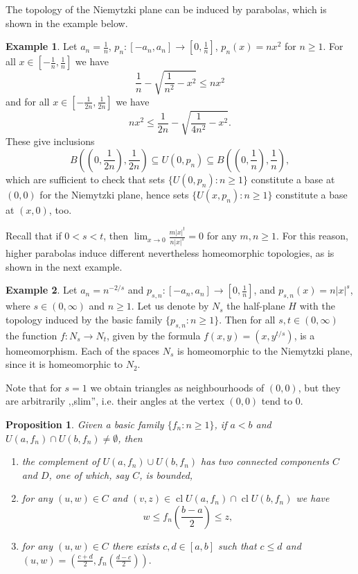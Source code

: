 \documentclass[a4paper,12pt,leqno]{amsart}
\newcommand{\cl}{\operatorname{cl}}
\newtheorem{pro}[thm]{Proposition}
\theoremstyle{definition}
\newtheorem{exm}{Example}
\renewcommand{\geq}{\geqslant}
\renewcommand{\leq}{\leqslant}
\begin{document}
The topology of the Niemytzki plane can be induced by parabolas, which is shown in the  example below.
\begin{exm}\label{exm:1}
  Let $a_n=\frac1{n}$, $p_{n}\colon [-a_n,a_n]\to[0,\frac1n]$, $p_{n}(x)=nx^2$ for  $n\geq 1$.
For all $x\in[-\frac1n,\frac1n]$ we have
  $$\textstyle\frac1n-\sqrt{\frac1{n^2}-x^2}\leq nx^2$$
  and for all $x\in[-\frac1{2n},\frac1{2n}]$ we have
  $$\textstyle nx^2\leq\frac1{2n}-\sqrt{\frac1{4n^2}-x^2}.$$
These give inclusions
$$\textstyle B((0,\frac1{2n}),\frac1{2n})\subseteq U(0,p_n)\subseteq B((0,\frac1n),\frac1n),$$
which are sufficient to check that sets $\{U(0,p_n)\colon n\geq 1\}$ constitute a base at $(0,0)$ for the Niemytzki plane, hence sets $\{U(x,p_n)\colon n\geq 1\}$ constitute a base at $(x,0)$, too.
\end{exm}

Recall that if $0<s<t$, then $\lim_{x\to0}\frac{m|x|^t}{n|x|^s}=0$ for any $m,n\geq 1$.
For this reason,  higher parabolas induce different nevertheless homeomorphic topologies, as is shown in the next example.

\begin{exm}\label{exm:2}
  Let $a_n=n^{-2/s}$ and $p_{s,n}\colon [-a_n,a_n]\to[0,\frac1n]$, and $p_{s,n}(x)=n|x|^s$, where $s\in(0,\infty)$ and $n\geq 1$.
  Let us denote by $N_s$ the half-plane $H$ with the topology induced by the basic family $\{p_{s,n}\colon n\geq 1\}$.
  Then for all $s,t\in(0,\infty)$ the function $f\colon N_s\to N_t$, given by the formula $f(x,y)=(x,y^{t/s})$, is a homeomorphism.
  Each of the spaces $N_s$ is homeomorphic to the Niemytzki plane, since it is homeomorphic to $N_2$.
\end{exm}

Note that for $s=1$ we obtain triangles as neighbourhoods of $(0,0)$, but they are arbitrarily ,,slim'', i.e. their  angles at the vertex $(0,0)$ tend to $0$.


\begin{pro}\label{pro1}
 Given a basic family  $\{f_n\colon n\geq 1\}$, if $a<b$ and $U(a,f_n)\cap U(b,f_n)\neq\emptyset$, then
  \begin{enumerate}
  \item[$(a)$] the complement of $U(a,f_n)\cup U(b,f_n)$  has two connected components $C$ and $D$, one of which, say $C$, is bounded,
  \item[$(b)$] for any $(u,w)\in C$ and $(v,z)\in \cl U(a,f_n)\cap \cl U(b,f_n)$ we have
    $$\textstyle w\leq f_n(\frac{b-a}2)\leq z,$$
      \item[$(c)$] for any  $(u,w)\in C$ there exists $c,d\in[a,b]$ such that $c\leq d$ and $(u,w)= (\frac{c+d}2,f_n(\frac{d-c}2)).$
  \end{enumerate}
\end{pro}
\end{document}
